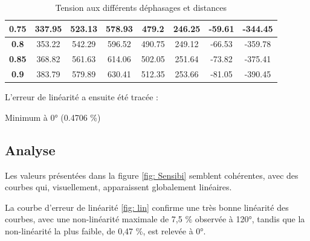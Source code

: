 \begin{table}[H]
\begin{tabular}{|c|ccccccc|}
    \textbf{0.75}              & \multicolumn{1}{c|}{337.95}     & \multicolumn{1}{c|}{523.13}      & \multicolumn{1}{c|}{578.93}      & \multicolumn{1}{c|}{479.2}       & \multicolumn{1}{c|}{246.25}       & \multicolumn{1}{c|}{-59.61}       & -344.45      \\ \hline
    \textbf{0.8}               & \multicolumn{1}{c|}{353.22}     & \multicolumn{1}{c|}{542.29}      & \multicolumn{1}{c|}{596.52}      & \multicolumn{1}{c|}{490.75}      & \multicolumn{1}{c|}{249.12}       & \multicolumn{1}{c|}{-66.53}       & -359.78      \\ \hline
    \textbf{0.85}              & \multicolumn{1}{c|}{368.82}     & \multicolumn{1}{c|}{561.63}      & \multicolumn{1}{c|}{614.06}      & \multicolumn{1}{c|}{502.05}      & \multicolumn{1}{c|}{251.64}       & \multicolumn{1}{c|}{-73.82}       & -375.41      \\ \hline
    \textbf{0.9}               & \multicolumn{1}{c|}{383.79}     & \multicolumn{1}{c|}{579.89}      & \multicolumn{1}{c|}{630.41}      & \multicolumn{1}{c|}{512.35}      & \multicolumn{1}{c|}{253.66}       & \multicolumn{1}{c|}{-81.05}       & -390.45      \\ \hline
    \end{tabular}
    \caption{Tension aux différents déphasages et distances}
    \end{table}



L'erreur de linéarité a ensuite été tracée :  


    Minimum à 0° (0.4706 \%)

    \subsection{Analyse}

    Les valeurs présentées dans la figure \ref{fig: Sensibi} semblent cohérentes, avec des courbes qui, 
    visuellement, apparaissent globalement linéaires.

    La courbe d'erreur de linéarité \ref{fig: lin} confirme une très bonne linéarité des courbes, 
    avec une non-linéarité maximale de 7,5 \% observée à 120°, tandis que la non-linéarité la plus 
    faible, de 0,47 \%, est relevée à 0°. \\
    
